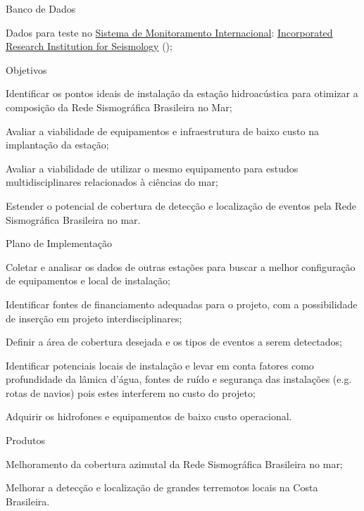 \documentclass[10pt,a4paper,oneside]{book}
\begin{document}
\begin{fancyenum}{\faDatabase}{Banco de Dados}
	\item Dados para teste no \href{https://www.ctbto.org/our-work/international-monitoring-system}{Sistema de Monitoramento Internacional}: \href{https://ds.iris.edu/gmap/\#network=IM\&planet=earth}{Incorporated Research Institution for Seismology} (\faUnlock);
\end{fancyenum}

\begin{fancyenum}{\faFutbol}{Objetivos}
	\item Identificar os pontos ideais de instalação da estação hidroacústica para otimizar a composição da Rede Sismográfica Brasileira no Mar;
	\item Avaliar a viabilidade de equipamentos e infraestrutura de baixo custo na implantação da estação;
	\item Avaliar a viabilidade de utilizar o mesmo equipamento para estudos multidisciplinares relacionados à ciências do mar;
	\item Estender o potencial de cobertura de detecção e localização de eventos pela Rede Sismográfica Brasileira no mar.
\end{fancyenum}


\begin{fancyenum}{\faBrain}{Plano de Implementação}
	\item Coletar e analisar os dados de outras estações para buscar a melhor configuração de equipamentos e local de instalação;
	\item Identificar fontes de financiamento adequadas para o projeto, com a possibilidade de inserção em projeto interdisciplinares;
	\item Definir a área de cobertura desejada e os tipos de eventos a serem detectados;
	\item Identificar potenciais locais de instalação e levar em conta fatores como profundidade da lâmica d'água, fontes de ruído e segurança das instalações (e.g. rotas de navios) pois estes interferem no custo do projeto;
	\item Adquirir os hidrofones e equipamentos de baixo custo operacional.
\end{fancyenum}

\begin{fancyenum}{\faShoppingCart}{Produtos}
	\item Melhoramento da cobertura azimutal da Rede Sismográfica Brasileira no mar;
	\item Melhorar a detecção e localização de grandes terremotos locais na Costa Brasileira.
\end{fancyenum}
\end{document}
